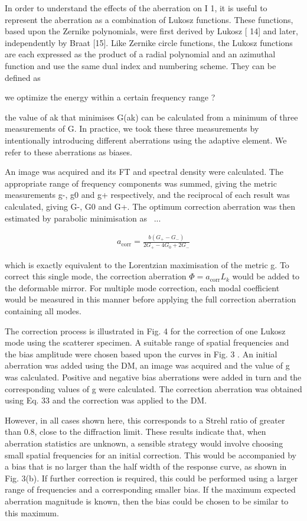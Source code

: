 In order to understand the effects of the aberration on I 1, it is useful to 
represent the aberration as a combination of Lukosz functions. These 
functions, based upon the Zernike polynomials, were first derived by Lukosz [
14] and later, independently by Braat [15]. Like Zernike circle functions, 
the Lukosz functions are each expressed as the product of a radial polynomial 
and an azimuthal function and use the same dual index and numbering scheme. 
They can be defined as

we optimize the energy within a certain frequency range ? 

the value of ak that minimises G(ak) can be calculated from a minimum of 
three measurements of G. In practice, we took these three measurements by 
intentionally introducing different aberrations using the adaptive element. 
We refer to these aberrations as biases.

An image was acquired and its FT and spectral density were calculated. The 
appropriate range of frequency components was summed, giving the metric 
measurements g-, g0 and g+ respectively, and the reciprocal of each result 
was calculated, giving G-, G0 and G+. The optimum correction aberration was 
then estimated by parabolic minimisation as~\cite{wide_parabolic_optimization}
...

\begin{align}
	a_\text{corr} = \frac{b(G_+ - G_-)}{2G_+ - 4G_0 + 2G_-}
\end{align}

which is exactly equivalent to the Lorentzian maximisation of the metric g. 
To correct this single mode, the correction aberration $\Phi = a_\text{corr}L_
k$ would be added to the deformable mirror. For multiple mode correction, 
each modal coefficient would be measured in this manner before applying the 
full correction aberration containing all modes.

The correction process is illustrated in Fig. 4 for the correction of one 
Lukosz mode using the scatterer specimen. A suitable range of spatial 
frequencies and the bias amplitude were chosen based upon the curves in Fig. 3
. An initial aberration was added using the DM, an image was acquired and the 
value of g was calculated. Positive and negative bias aberrations were added 
in turn and the corresponding values of g were calculated. The correction 
aberration was obtained using Eq. 33 and the correction was applied to the DM.

However, in all cases shown here, this corresponds to a Strehl ratio of 
greater than 0.8, close to the diffraction limit. These results indicate 
that, when aberration statistics are unknown, a sensible strategy would 
involve choosing small spatial frequencies for an initial correction. This 
would be accompanied by a bias that is no larger than the half width of the 
response curve, as shown in Fig. 3(b). If further correction is required, 
this could be performed using a larger range of frequencies and a 
corresponding smaller bias. If the maximum expected aberration magnitude is 
known, then the bias could be chosen to be similar to this maximum. 

